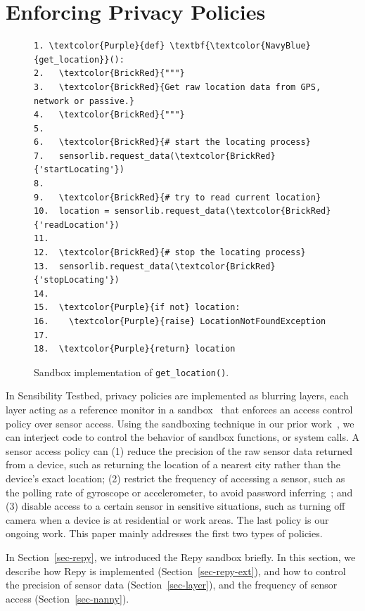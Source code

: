 \section{Enforcing Privacy Policies}\label{sec-policy}

\begin{figure}
\begin{Verbatim}
1. \textcolor{Purple}{def} \textbf{\textcolor{NavyBlue}{get_location}}():
2.   \textcolor{BrickRed}{"""}
3.   \textcolor{BrickRed}{Get raw location data from GPS, network or passive.}
4.   \textcolor{BrickRed}{"""}
5. 
6.   \textcolor{BrickRed}{# start the locating process} 
7.   sensorlib.request_data(\textcolor{BrickRed}{'startLocating'})
8.
9.   \textcolor{BrickRed}{# try to read current location}
10.  location = sensorlib.request_data(\textcolor{BrickRed}{'readLocation'})
11.
12.  \textcolor{BrickRed}{# stop the locating process} 
13.  sensorlib.request_data(\textcolor{BrickRed}{'stopLocating'})
14.
15.  \textcolor{Purple}{if not} location:
16.    \textcolor{Purple}{raise} LocationNotFoundException    
17.  
18.  \textcolor{Purple}{return} location
\end{Verbatim}
\caption{\small Sandbox implementation of \texttt{get\_location()}. 
\label{fig-getlocation}}
\end{figure}

In Sensibility Testbed, privacy policies are implemented as blurring layers, each layer acting as a 
reference monitor in a sandbox~\cite{ref} that enforces an access 
control policy over sensor access. Using the sandboxing 
technique in our prior work~\cite{cappos2010retaining}, we can 
interject code to control the behavior of sandbox functions, or 
system calls. A sensor access policy can (1) reduce 
the precision of the raw sensor data returned from a device, such
as returning the location of a nearest city rather than the device's exact location; (2) restrict 
the frequency of accessing a sensor, such as the polling rate of gyroscope or
accelerometer, to avoid password inferring~\cite{michalevsky2014gyrophone}; and (3) disable  
access to a certain sensor in sensitive situations, such as 
turning off camera when a device is at residential or work areas.
The last policy is our ongoing work. This paper mainly addresses
the first two types of policies. 

In Section~\ref{sec-repy}, we introduced the Repy sandbox briefly. 
In this section, we describe how Repy is implemented
(Section~\ref{sec-repy-ext}), and 
how to control the precision of sensor data (Section~\ref{sec-layer}), 
and the frequency of sensor access (Section~\ref{sec-nanny}).

